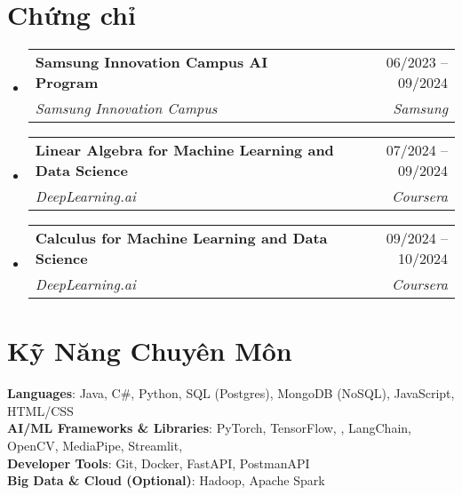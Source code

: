 \documentclass[letterpaper,11pt]{article}
\makeatletter
\newcommand{\resumeSubheading}[4]{
	\vspace{-2pt}\item
	\begin{tabular*}{0.97\textwidth}[t]{l@{\extracolsep{\fill}}r}
		\textbf{#1} & #2 \\
		\textit{\small#3} & \textit{\small #4} \\
	\end{tabular*}\vspace{-7pt}
}
\newcommand{\resumeSubHeadingListStart}{\begin{itemize}[leftmargin=0.15in, label={}]}
\newcommand{\resumeSubHeadingListEnd}{\end{itemize}}
\makeatother
\begin{document}
\section{Chứng chỉ}
	\resumeSubHeadingListStart
		\resumeSubheading
			{Samsung Innovation Campus AI Program}{06/2023 -- 09/2024}
			{Samsung Innovation Campus}{Samsung}

		\resumeSubheading
			{Linear Algebra for Machine Learning and Data Science}{07/2024 -- 09/2024}
			{DeepLearning.ai}{Coursera}

		\resumeSubheading
			{Calculus for Machine Learning and Data Science} {09/2024 -- 10/2024}
			{DeepLearning.ai}{Coursera}
	\resumeSubHeadingListEnd

\section{Kỹ Năng Chuyên Môn}
\begin{itemize}[leftmargin=0.15in, label={}]
\small{\item{
	\textbf{Languages}{: Java, C\#, Python, SQL (Postgres), MongoDB (NoSQL), JavaScript, HTML/CSS} \\
	\textbf{AI/ML Frameworks \& Libraries}{: PyTorch, TensorFlow, , LangChain, OpenCV, MediaPipe, Streamlit, } \\
	\textbf{Developer Tools}{: Git, Docker, FastAPI, PostmanAPI} \\
	\textbf{Big Data \& Cloud (Optional)}{: Hadoop, Apache Spark}
}}
\end{itemize}
\end{document}
